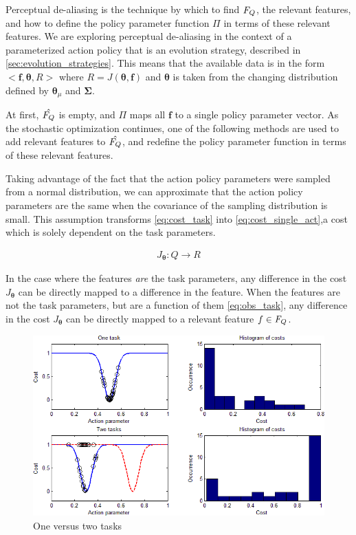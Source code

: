 \documentclass[12pt]{article}
\newcommand{\mymath}[1]{\ensuremath{#1}\xspace}
\newcommand{\app}    {\mymath{\bm{\theta}}}
\newcommand{\polg}   {\mymath{\Pi}}
\newcommand{\taskpsp}{\mymath{Q}}
\newcommand{\costsp} {\mymath{R}}
\newcommand{\costf}  {\mymath{J}}
\newcommand{\covar}  {\mymath{\bm{\Sigma}}}
\newcommand{\cost}	 {\mymath{R}}
\newcommand{\feat}   {\mymath{f}}
\newcommand{\featv}  {\mymath{\mathbf{f}}}
\newcommand{\featsp} {\mymath{\emph{F}}}
\begin{document}
Perceptual de-aliasing is the technique by which to find $\featsp_Q$, the relevant features, and how to define the policy parameter function \polg in terms of these relevant features. We are exploring perceptual de-aliasing in the context of a parameterized action policy that is an evolution strategy, described in \ref{sec:evolution_strategies}. This means that the available data is in the form $<\featv,\app,\cost>$ where $\cost = \costf(\app,\featv)$ and \app is taken from the changing distribution defined by $\app_\mu$ and \covar.


At first, $\hat{\featsp_Q}$ is empty, and \polg maps all \featv to a single policy parameter vector. As the stochastic optimization continues, one of the following methods are used to add relevant features to $\hat{\featsp_Q}$, and redefine the policy parameter function in terms of these relevant features.

Taking advantage of the fact that the action policy parameters were sampled from a normal distribution, we can approximate that the action policy parameters are the same when the covariance of the sampling distribution is small. This assumption transforms \eqref{eq:cost_task} into \eqref{eq:cost_single_act},a cost which is solely dependent on the task parameters.


\begin{align}
	\label{eq:cost_single_act}\costf_{\app}: \taskpsp \to \costsp
\end{align} 

In the case where the features \emph{are} the task parameters, any difference in the cost $\costf_{\app}$ can be directly mapped to a difference in the feature. When the features are not the task parameters, but are a function of them \eqref{eq:obs_task}, any difference in the cost $\costf_{\app}$ can be directly mapped to a relevant feature $\feat \in \featsp_Q$.

\begin{figure}[ht]
  \centering
  \includegraphics[width=0.9\columnwidth]{one_vs_two_tasks.png}
  \caption{One versus two tasks}
  \label{fig:1vs2tasks}
\end{figure} 
\end{document}
